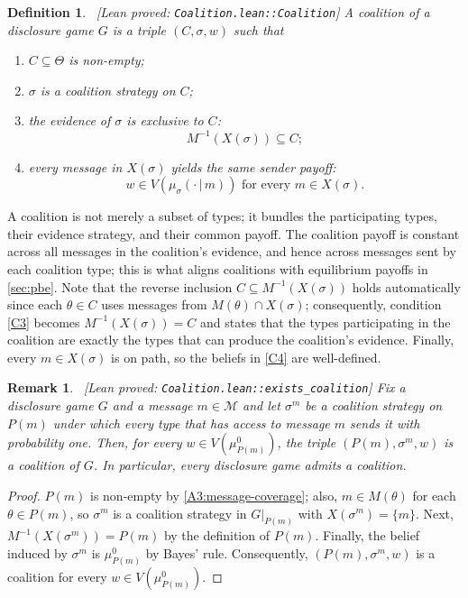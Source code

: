 \documentclass[11pt]{article}
\newtheorem{remark}{Remark}
\newtheorem{definition}{Definition}
\newcommand{\sep}{\,|\,}
\newcommand{\Msg}{\mathcal{M}}
\newcommand{\leanproved}[1]{{\footnotesize\textsf{\textcolor{green!55!black}{[Lean proved: \texttt{#1}]}}}}
\begin{document}
\begin{definition}\label{dfn:coalition}\ \leanproved{Coalition.lean::Coalition}
    A \emph{coalition} of a disclosure game $G$ is a triple $(C,\sigma,w)$ such that
    \begin{enumerate}[label=(C\arabic*), ref=(C\arabic*)]
    \item \label{C1} $C \subseteq \Theta$ is non-empty;
    \item \label{C2} $\sigma$ is a coalition strategy on $C$;
    \item \label{C3} the evidence of $\sigma$ is exclusive to $C$:
    \[
        M^{-1}(X(\sigma)) \subseteq C;
    \]
    \item \label{C4} every message in $X(\sigma)$ yields the same sender payoff:
    \[
        w \in V( \mu_\sigma (\cdot \sep m) ) \text{ for every } m \in X(\sigma).
    \]
\end{enumerate}
\end{definition}
 A coalition is not merely a subset of types; it bundles the participating types, their evidence strategy, and their common payoff. The coalition payoff is constant across all messages in the coalition's evidence, and hence across messages sent by each coalition type; this is what aligns coalitions with equilibrium payoffs in \cref{sec:pbe}. Note that the reverse inclusion $C \subseteq M^{-1}(X(\sigma))$ holds automatically since each $\theta \in C$ uses messages from $M(\theta) \cap X(\sigma)$; consequently, condition \cref{C3} becomes $M^{-1}(X(\sigma)) = C$ and states that the types participating in the coalition are exactly the types that can produce the coalition's evidence. Finally, every $m \in X(\sigma)$ is on path, so the beliefs in \cref{C4} are well-defined.

\begin{remark}\label{remark:coalitions-exist}\ \leanproved{Coalition.lean::exists\_coalition}
    Fix a disclosure game $G$ and a message $m \in \Msg$ and let $\sigma^m$ be a coalition strategy on $P(m)$ under which every type that has access to message $m$ sends it with probability one. Then, for every $w \in V( \mu^0_{P(m)})$, the triple $(P(m),\sigma^m,w)$ is a coalition of $G$. In particular, every disclosure game admits a coalition.
\end{remark}
\begin{proof}
    $P(m)$ is non-empty by \cref{A3:message-coverage}; also, $m \in M(\theta)$ for each $\theta \in P(m)$, so $\sigma^m$ is a coalition strategy in $G\vert_{P(m)}$ with $X(\sigma^m) = \{ m \}$. Next, $M^{-1}(X(\sigma^m)) = P(m)$ by the definition of $P(m)$. Finally, the belief induced by $\sigma^m$ is $\mu^0_{P(m)}$ by Bayes' rule. Consequently, $(P(m),\sigma^m,w)$ is a coalition for every $w \in V( \mu^0_{P(m)} )$.
\end{proof}
\end{document}

